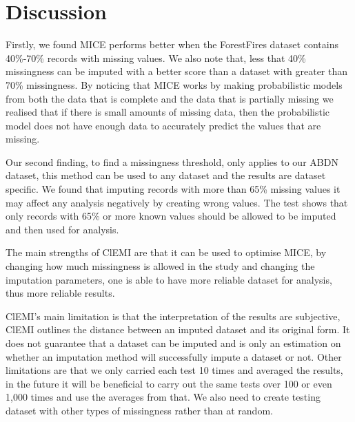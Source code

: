 \documentclass[conference,compsoc]{IEEEtran}
\begin{document}
	\section{Discussion} %
	\label{sec:discussion}
	Firstly, we found MICE performs better when the ForestFires dataset contains 40\%-70\% records with missing values. We also note that, less that 40\% missingness can be imputed with a better score than a dataset with greater than 70\% missingness. By noticing that MICE works by making probabilistic models from both the data that is complete and the data that is partially missing we realised that if there is small amounts of missing data, then the probabilistic model does not have enough data to accurately predict the values that are missing. 

	Our second finding, to find a missingness threshold, only applies to our ABDN dataset, this method can be used to any dataset and the results are dataset specific. We found that imputing records with more than 65\% missing values it may affect any analysis negatively by creating wrong values. The test shows that only records with 65\% or more known values should be allowed to be imputed and then used for analysis.


	The main strengths of ClEMI are that it can be used to optimise MICE, by changing how much missingness is allowed in the study and changing the imputation parameters, one is able to have more reliable dataset for analysis, thus more reliable results. 

	ClEMI's main limitation is that the interpretation of the results are subjective, ClEMI outlines the distance between an imputed dataset and its original form. It does not guarantee that a dataset can be imputed and is only an estimation on whether an imputation method will successfully impute a dataset or not. Other limitations are that we only carried each test 10 times and averaged the results, in the future it will be beneficial to carry out the same tests over 100 or even 1,000 times and use the averages from that. We also need to create testing dataset with other types of missingness rather than at random. 
	
\end{document}
